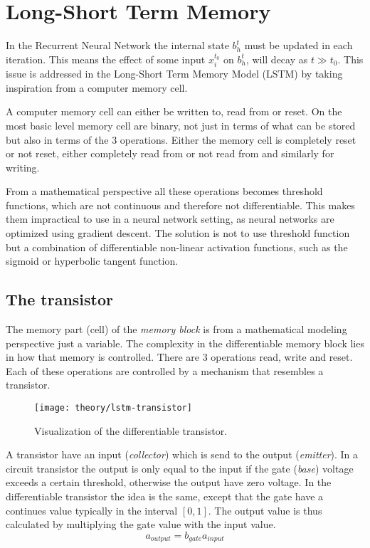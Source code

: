 
\section{Long-Short Term Memory}
\label{sec:Long-Short-Term-Memory}
In the Recurrent Neural Network the internal state $b_h^t$ must be updated in each iteration. This means the effect of some input $x_i^{t_0}$ on $b_h^{t}$, will decay as $t \gg t_0$. This issue is addressed in the Long-Short Term Memory Model (LSTM) by taking inspiration from a computer memory cell.

A computer memory cell can either be written to, read from or reset. On the most basic level memory cell are binary, not just in terms of what can be stored but also in terms of the 3 operations. Either the memory cell is completely reset or not reset, either completely read from or not read from and similarly for writing.

From a mathematical perspective all these operations becomes threshold functions, which are not continuous and therefore not differentiable. This makes them impractical to use in a neural network setting, as neural networks are optimized using gradient descent. The solution is not to use threshold function but a combination of differentiable non-linear activation functions, such as the sigmoid or hyperbolic tangent function.

\subsection{The transistor}

The memory part (cell) of the \textit{memory block} is from a mathematical modeling perspective just a variable. The complexity in the differentiable memory block lies in how that memory is controlled. There are 3 operations read, write and reset. Each of these operations are controlled by a mechanism that resembles a transistor.

\begin{figure}[h]
	\centering
	\texttt{[image: theory/lstm-transistor]}
	\caption{Visualization of the differentiable transistor.}
	\label{fig:theory:lstm:lstm-transistor}
\end{figure}

A transistor have an input (\textit{collector}) which is send to the output (\textit{emitter}). In a circuit transistor the output is only equal to the input if the gate (\textit{base}) voltage exceeds a certain threshold, otherwise the output have zero voltage. In the differentiable transistor the idea is the same, except that the gate have a continues value typically in the interval $[0, 1]$. The output value is thus calculated by multiplying the gate value with the input value.
\begin{equation}
a_{output} = b_{gate} a_{input}
\end{equation}

